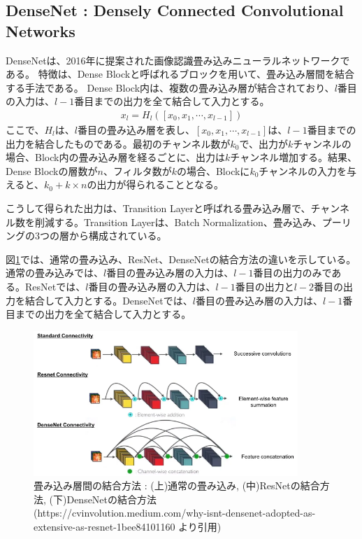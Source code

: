 \documentclass{ltjsarticle}
\begin{document}
\subsection{DenseNet : Densely Connected Convolutional Networks}
DenseNetは、2016年に提案された画像認識畳み込みニューラルネットワークである。
特徴は、Dense Blockと呼ばれるブロックを用いて、畳み込み層間を結合する手法である。
Dense Block内は、複数の畳み込み層が結合されており、$l$番目の入力は、$l-1$番目までの出力を全て結合して入力とする。
\begin{align}
  x_l = H_l([x_0, x_1, \cdots, x_{l-1}])
\end{align}
ここで、$H_l$は、$l$番目の畳み込み層を表し、$[x_0, x_1, \cdots, x_{l-1}]$は、$l-1$番目までの出力を結合したものである。最初のチャンネル数が$k_0$で、出力が$k$チャンネルの場合、Block内の畳み込み層を経るごとに、出力は$k$チャンネル増加する。結果、Dense Blockの層数が$n$、フィルタ数が$k$の場合、Blockに$k_0$チャンネルの入力を与えると、$k_0 + k \times n$の出力が得られることとなる。
\par
こうして得られた出力は、Transition Layerと呼ばれる畳み込み層で、チャンネル数を削減する。Transition Layerは、Batch Normalization、畳み込み、プーリングの3つの層から構成されている。
\par
図\ref{fig:CNN_connection}では、通常の畳み込み、ResNet、DenseNetの結合方法の違いを示している。通常の畳み込みでは、$l$番目の畳み込み層の入力は、$l-1$番目の出力のみである。ResNetでは、$l$番目の畳み込み層の入力は、$l-1$番目の出力と$l-2$番目の出力を結合して入力とする。DenseNetでは、$l$番目の畳み込み層の入力は、$l-1$番目までの出力を全て結合して入力とする。

\begin{figure}[htbp]
  \centering
  \includegraphics[width=10cm]{./capture/CNN_connection.png}
  \caption{畳み込み層間の結合方法 : (上)通常の畳み込み, (中)ResNetの結合方法, (下)DenseNetの結合方法 (https://cvinvolution.medium.com/why-isnt-densenet-adopted-as-extensive-as-resnet-1bee84101160 より引用)}
  \label{fig:CNN_connection}
\end{figure}
\end{document}
